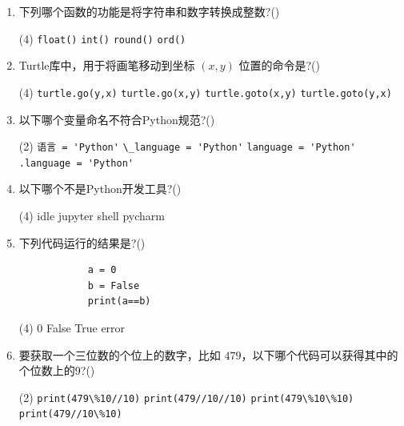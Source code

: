\documentclass[11pt]{ctexart}
\begin{document}
\begin{enumerate}
        \item 下列哪个函数的功能是将字符串和数字转换成整数?(\qquad)
        \begin{tasks}(4)
            \task \lstinline{float()}
            \task \lstinline{int()}
            \task \lstinline{round()}
            \task \lstinline{ord()}
        \end{tasks}
        
        \item Turtle库中，用于将画笔移动到坐标 $(x,y)$ 位置的命令是?(\qquad)
        \begin{tasks}(4)
            \task \lstinline{turtle.go(y,x)}
            \task \lstinline{turtle.go(x,y)}
            \task \lstinline{turtle.goto(x,y)}
            \task \lstinline{turtle.goto(y,x)}
        \end{tasks}

        \item 以下哪个变量命名不符合Python规范?(\qquad)
        \begin{tasks}(2)
            \task \lstinline{语言 = 'Python'}
            \task \lstinline{\_language = 'Python'}
            \task \lstinline{language = 'Python'}
            \task \lstinline{.language = 'Python'}
        \end{tasks}

        \item 以下哪个不是Python开发工具?(\qquad)
        \begin{tasks}(4)
            \task idle
            \task jupyter
            \task shell
            \task pycharm
        \end{tasks}

        \item 下列代码运行的结果是?(\qquad)
        \begin{lstlisting}
            a = 0
            b = False
            print(a==b)
        \end{lstlisting}
        \begin{tasks}(4)
            \task $0$
            \task False
            \task True
            \task error
        \end{tasks}

        \item 要获取一个三位数的个位上的数字，比如 $479$，以下哪个代码可以获得其中的个位数上的9?(\qquad)
        \begin{tasks}(2)
            \task \lstinline!print(479\%10//10)!
            \task \lstinline!print(479//10//10)!
            \task \lstinline!print(479\%10\%10)!
            \task \lstinline!print(479//10\%10)!
        \end{tasks}


\end{enumerate}
\end{document}
